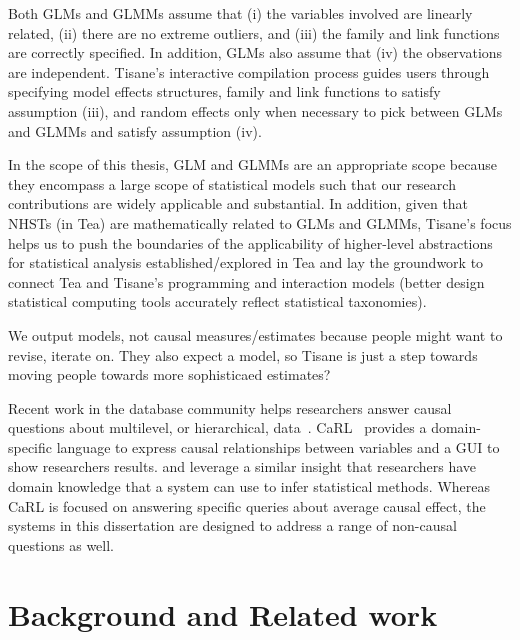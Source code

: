 Both GLMs and GLMMs assume that (i) the variables involved are linearly related,
(ii) there are no extreme outliers, and (iii) the family and link functions are
correctly specified. In addition, GLMs also assume that (iv) the observations
are independent. Tisane's interactive compilation process guides users through
specifying model effects structures, family and link functions to satisfy
assumption (iii), and random effects only when necessary to pick between GLMs
and GLMMs and satisfy assumption (iv).

In the scope of this thesis, GLM and GLMMs are an appropriate scope because they
encompass a large scope of statistical models such that our research
contributions are widely applicable and substantial. In addition, given that
NHSTs (in Tea) are mathematically related to GLMs and GLMMs, Tisane's focus
helps us to push the boundaries of the applicability of higher-level
abstractions for statistical analysis established/explored in Tea and lay the
groundwork to connect Tea and Tisane's programming and interaction models
(better design statistical computing tools accurately reflect statistical
taxonomies).

We output models, not causal measures/estimates because people might want to revise, iterate on. They also expect a model, so Tisane is just a step towards moving people towards more sophisticaed estimates? 

Recent work in the database community helps researchers answer causal questions
about multilevel, or hierarchical, data~\cite{salimi2020causal, kayali2020demonstration}.
CaRL~\cite{salimi2020causal} provides a domain-specific language to express
causal relationships between variables and a GUI to show researchers %
results. \tea and \tisane leverage a similar insight that researchers have domain
knowledge that a system can use to infer statistical methods. Whereas CaRL is
focused on answering specific queries about average causal effect, the systems
in this dissertation are designed to address a range of non-causal questions as well.


\section{Background and Related work}
